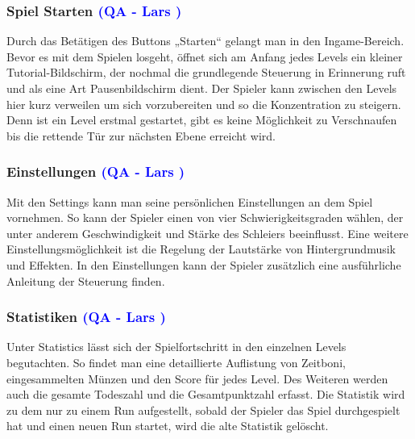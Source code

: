 \documentclass[12pt]{article}
\begin{document}
\vspace{1cm}
\subsubsection{Spiel Starten \textcolor{blue}{(QA - Lars )}}

Durch das Betätigen des Buttons „Starten“ gelangt man in den Ingame-Bereich. Bevor es mit dem Spielen losgeht, öffnet sich am Anfang jedes
Levels ein kleiner Tutorial-Bildschirm, der nochmal die grundlegende Steuerung in Erinnerung ruft und als eine Art Pausenbildschirm dient. Der Spieler kann zwischen den Levels hier kurz verweilen um sich vorzubereiten und so die Konzentration zu steigern. Denn ist ein Level erstmal gestartet, gibt es keine Möglichkeit zu Verschnaufen bis die rettende Tür zur nächsten Ebene erreicht wird.

\vspace{1cm}
\subsubsection{Einstellungen \textcolor{blue}{(QA - Lars )}}

Mit den Settings kann man seine persönlichen Einstellungen an dem Spiel vornehmen. So kann der Spieler einen von vier Schwierigkeitsgraden wählen, der unter anderem Geschwindigkeit und Stärke des Schleiers beeinflusst. \newline
Eine weitere Einstellungsmöglichkeit ist die Regelung der Lautstärke von Hintergrundmusik und Effekten. \newline
In den Einstellungen kann der Spieler zusätzlich eine ausführliche Anleitung der Steuerung finden.

\vspace{1cm}
\subsubsection{Statistiken \textcolor{blue}{(QA - Lars )}}

Unter Statistics lässt sich der Spielfortschritt in den einzelnen Levels begutachten. So findet man eine detaillierte Auflistung von Zeitboni, eingesammelten Münzen und den Score für jedes Level. Des Weiteren werden auch die gesamte Todeszahl und die Gesamtpunktzahl erfasst. Die Statistik wird zu dem  nur zu einem Run aufgestellt, sobald der Spieler das Spiel durchgespielt hat und einen neuen Run startet, wird die alte Statistik gelöscht.
\end{document}
